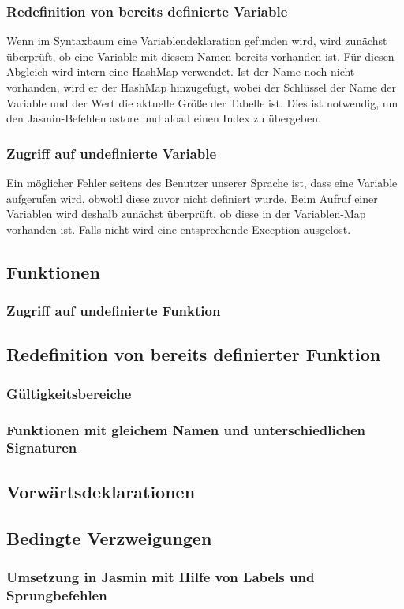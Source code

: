 \subsubsection{Redefinition von bereits definierte Variable}
Wenn im Syntaxbaum eine Variablendeklaration gefunden wird, wird zunächst überprüft, ob eine Variable mit diesem Namen bereits vorhanden ist. Für diesen Abgleich wird intern eine HashMap verwendet. Ist der Name noch nicht vorhanden, wird er der HashMap hinzugefügt, wobei der Schlüssel der Name der Variable und der Wert die aktuelle Größe der Tabelle ist. Dies ist notwendig, um den Jasmin-Befehlen astore und aload einen Index  zu übergeben.

\subsubsection{Zugriff auf undefinierte Variable}
Ein möglicher Fehler seitens des Benutzer unserer Sprache ist, dass eine Variable aufgerufen wird, obwohl diese zuvor nicht definiert wurde. Beim Aufruf einer Variablen wird deshalb zunächst überprüft, ob diese in der Variablen-Map vorhanden ist. Falls nicht wird eine entsprechende Exception ausgelöst.


\subsection{Funktionen}
\subsubsection{Zugriff auf undefinierte Funktion}
\subsection{Redefinition von bereits definierter Funktion}
\subsubsection{Gültigkeitsbereiche}
\subsubsection{Funktionen mit gleichem Namen und unterschiedlichen Signaturen}
\subsection{Vorwärtsdeklarationen}

\subsection{Bedingte Verzweigungen}
\subsubsection{Umsetzung in Jasmin mit Hilfe von Labels und Sprungbefehlen}


